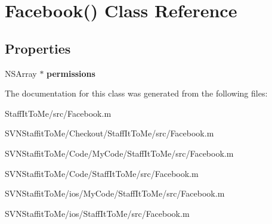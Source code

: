 \hypertarget{interface_facebook_07_08}{
\section{\-Facebook() \-Class \-Reference}
\label{interface_facebook_07_08}
}
\subsection*{\-Properties}
\begin{DoxyCompactItemize}
\item 
\hypertarget{interface_facebook_07_08_acee759c0fd0ac8fca53931036507ad43}{
\-N\-S\-Array $\ast$ {\bfseries permissions}}
\label{interface_facebook_07_08_acee759c0fd0ac8fca53931036507ad43}

\end{DoxyCompactItemize}


\-The documentation for this class was generated from the following files\-:\begin{DoxyCompactItemize}
\item 
\-Staff\-It\-To\-Me/src/\-Facebook.\-m\item 
\-S\-V\-N\-Staffit\-To\-Me/\-Checkout/\-Staff\-It\-To\-Me/src/\-Facebook.\-m\item 
\-S\-V\-N\-Staffit\-To\-Me/\-Code/\-My\-Code/\-Staff\-It\-To\-Me/src/\-Facebook.\-m\item 
\-S\-V\-N\-Staffit\-To\-Me/\-Code/\-Staff\-It\-To\-Me/src/\-Facebook.\-m\item 
\-S\-V\-N\-Staffit\-To\-Me/ios/\-My\-Code/\-Staff\-It\-To\-Me/src/\-Facebook.\-m\item 
\-S\-V\-N\-Staffit\-To\-Me/ios/\-Staff\-It\-To\-Me/src/\-Facebook.\-m\end{DoxyCompactItemize}
